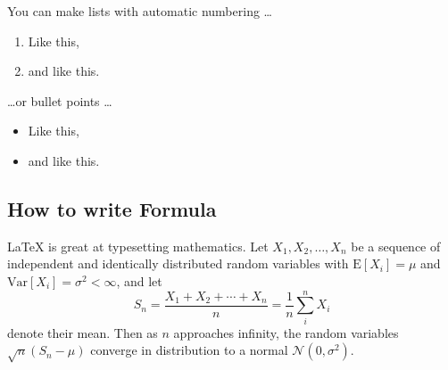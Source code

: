You can make lists with automatic numbering \dots

\begin{enumerate}
\item Like this,
\item and like this.
\end{enumerate}
\dots or bullet points \dots
\begin{itemize}
\item Like this,
\item and like this.
\end{itemize}

\subsection{How to write Formula}

\LaTeX{} is great at typesetting mathematics. Let $X_1, X_2, \ldots, X_n$ be a sequence of independent and identically distributed random variables with $\text{E}[X_i] = \mu$ and $\text{Var}[X_i] = \sigma^2 < \infty$, and let
\[S_n = \frac{X_1 + X_2 + \cdots + X_n}{n}
      = \frac{1}{n}\sum_{i}^{n} X_i\]
denote their mean. Then as $n$ approaches infinity, the random variables $\sqrt{n}(S_n - \mu)$ converge in distribution to a normal $\mathcal{N}(0, \sigma^2)$.



















































